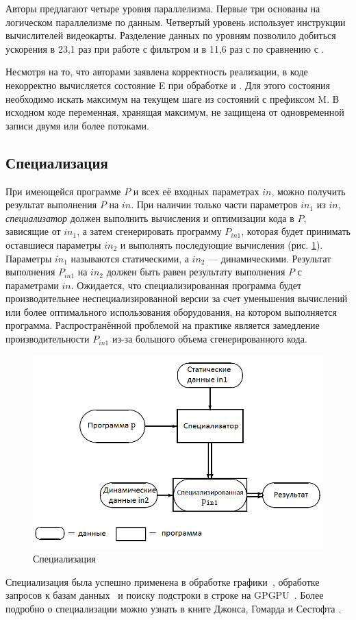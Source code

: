 Авторы предлагают четыре уровня параллелизма.
Первые три основаны на логическом параллелизме по данным.
Четвертый уровень использует  инструкции вычислителей видеокарты.
Разделение данных по уровням позволило добиться ускорения в 23,1 раз при работе 
с фильтром  и в 11,6 раз с  по сравнению с
.

Несмотря на то, что авторами заявлена корректность реализации, в коде некорректно
вычисляется состояние E при обработке  и .
Для этого состояния необходимо искать максимум на текущем шаге из состояний с 
префиксом M.
В исходном коде  переменная, хранящая максимум, 
не защищена от одновременной записи двумя или более потоками.

\subsection{Специализация}
При имеющейся программе $P$ и всех её входных параметрах 
$in$, можно получить результат выполнения $P$ на $in$.
При наличии только части параметров $in_1$ из $in$, 
\emph{специализатор} должен выполнить
вычисления и оптимизации кода в $P$, зависящие от $in_1$, 
а затем сгенерировать программу $P_{in1}$, 
которая будет принимать оставшиеся параметры $in_2$ и 
выполнять последующие вычисления (рис. \ref{spec}).
Параметры $in_1$ называются статическими, 
а $in_2$ --- динамическими.
Результат выполнения $P_{in1}$ на $in_2$ должен быть равен 
результату выполнения $P$ с параметрами $in$.
Ожидается, что специализированная программа будет 
производительнее неспециализированной версии за счет 
уменьшения вычислений или более оптимального использования 
оборудования, на котором выполняется программа.
Распространённой проблемой на практике является замедление 
производительности $P_{in1}$ из-за большого объема 
сгенерированного кода.
\begin{figure}
  \centering
  \includegraphics[width=\columnwidth]{spec.png}
  \caption{Специализация~\cite{Jones_spec}}
  \label{spec}
\end{figure}

Специализация была успешно применена в обработке 
графики~\cite{RT_spec}, обработке запросов к базам 
данных~\cite{SQL_spec} и поиску подстроки в строке на 
GPGPU~\cite{part_eval_GPU}.
Более подробно о специализации можно узнать в книге Джонса, 
Гомарда и Сестофта \cite{Jones_spec}.